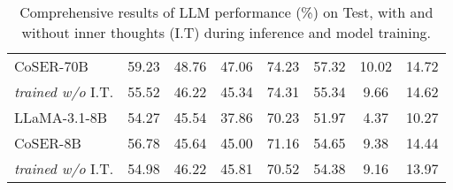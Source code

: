 \begin{table*}[htbp]
{\begin{tabular}{lccccccc}
CoSER-70B & 59.23 & 48.76 & 47.06 & 74.23 & 57.32 & 10.02 & 14.72 \\
 \hfill\hfill\hfill {\textit{trained w/o} \textsc{I.T.}} & 55.52 & 46.22 & 45.34 & 74.31 & 55.34 & 9.66 & 14.62 \\
LLaMA-3.1-8B & 54.27 & 45.54 & 37.86 & 70.23 & 51.97 & 4.37 & 10.27 \\
CoSER-8B & 56.78 & 45.64 & 45.00 & 71.16 & 54.65 & 9.38 & 14.44 \\
 \hfill\hfill\hfill {\textit{trained w/o} \textsc{I.T.}} & 54.98 & 46.22 & 45.81 & 70.52 & 54.38 & 9.16 & 13.97 \\
\bottomrule
\end{tabular}}
\caption{Comprehensive results of LLM performance (\%) on \method Test, with and without inner thoughts (I.T) during inference and \method model training.}
\label{tab:model-comparison-wo-cot-full}
\end{table*}
